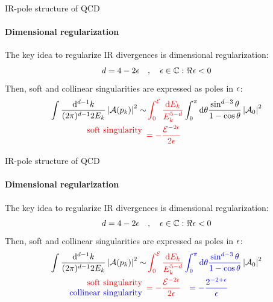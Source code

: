 
\begin{frame}{IR-pole structure of QCD}
  \framesubtitle{Dimensional regularization}

  The key idea to regularize IR divergences is dimensional regularization:
  \begin{equation*}
    d = 4 - 2 \epsilon
    \quad , \quad
    \epsilon \in \mathbb{C} : \Re{\epsilon} < 0
  \end{equation*}
  Then, soft and collinear singularities are expressed as poles in $ \epsilon $:
  \begin{equation*}
    \begin{split}
      \int \frac{\mathrm{d}^{d-1}k}{(2\pi)^{d-1} 2E_k} \left\lvert\mathcal{A}(p_k)\right\rvert^2 \sim
      & \, \textcolor{red}{\int_0^{\mathcal{E}} \frac{\mathrm{d} E_k}{E_k^{5-d}}} \int_0^\pi \mathrm{d} \theta \frac{\sin^{d-3} \theta}{1 - \cos \theta} \left\lvert\mathcal{A}_0\right\rvert^2 \\
      \begin{array}{r}
        \textcolor{red}{\text{soft singularity}} \\
        \text{ }
      \end{array}
      & \textcolor{red}{= - \frac{\mathcal{E}^{-2\epsilon}}{2\epsilon}}
    \end{split}
  \end{equation*}

\end{frame}


\begin{frame}{IR-pole structure of QCD}
  \framesubtitle{Dimensional regularization}

  The key idea to regularize IR divergences is dimensional regularization:
  \begin{equation*}
    d = 4 - 2 \epsilon
    \quad , \quad
    \epsilon \in \mathbb{C} : \Re{\epsilon} < 0
  \end{equation*}
  Then, soft and collinear singularities are expressed as poles in $ \epsilon $:
  \begin{equation*}
    \begin{split}
      \int \frac{\mathrm{d}^{d-1}k}{(2\pi)^{d-1} 2E_k} \left\lvert\mathcal{A}(p_k)\right\rvert^2 \sim
      & \, \textcolor{red}{\int_0^{\mathcal{E}} \frac{\mathrm{d} E_k}{E_k^{5-d}}} \, \textcolor{blue}{\int_0^\pi \mathrm{d} \theta \frac{\sin^{d-3} \theta}{1 - \cos \theta}} \left\lvert\mathcal{A}_0\right\rvert^2 \\
      \begin{array}{r}
        \textcolor{red}{\text{soft singularity}} \\
        \textcolor{blue}{\text{collinear singularity}}
      \end{array}
      & \textcolor{red}{= - \frac{\mathcal{E}^{-2\epsilon}}{2\epsilon}} \quad \textcolor{blue}{= - \frac{2^{-2 + \epsilon}}{\epsilon}}
    \end{split}
  \end{equation*}

\end{frame}

